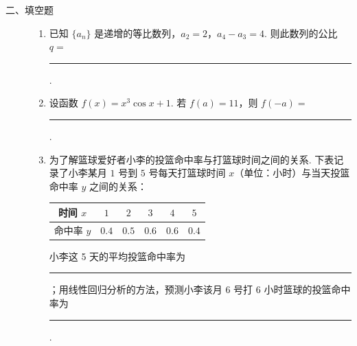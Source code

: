 \begin{description}

    \item[二、填空题]

    \begin{enumerate}[leftmargin=5pt]

      \addtocounter{enumi}{+10}

        \item 已知 \(\{a_{n}\}\) 是递增的等比数列，\(a_{2} = 2\)，\(a_{4} - a_{3} = 4\). 则此数列的公比 \(q = \)\rule[-0.3ex]{3em}{0.4pt}.

        \item 设函数 \( f(x) = x^{3}\cos x + 1 \). 若 \( f(a) = 11 \)，则 \( f(-a) = \)\rule[-0.3ex]{3em}{0.4pt}.

        \item 为了解篮球爱好者小李的投篮命中率与打篮球时间之间的关系. 下表记录了小李某月 \(1\) 号到 \(5\) 号每天打篮球时间 \(x\)（单位：小时）与当天投篮命中率 \(y\) 之间的关系：

\begin{center}
\begin{tabular}{c|ccccc}
时间 \(x\) & \(1\) & \(2\) & \(3\) & \(4\) & \(5\) \\
\hline
命中率 \(y\) & \(0.4\) & \(0.5\) & \(0.6\) & \(0.6\) & \(0.4\)
\end{tabular}
\end{center}

小李这 5 天的平均投篮命中率为\rule[-0.3ex]{3em}{0.4pt}；用线性回归分析的方法，预测小李该月 6 号打 6 小时篮球的投篮命中率为\rule[-0.3ex]{3em}{0.4pt}.

    \end{enumerate}

\end{description}

